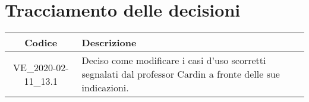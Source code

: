\section*{Tracciamento delle decisioni}

\begin{center}
	\begin{longtable}{|c|p{12.25cm}|}
	\hline
	\rowcolor{lighter-grayer}
	\textbf{Codice} & \textbf{Descrizione} \\
	\hline
	\endfirsthead
	
	\hline
	VE\_2020-02-11\_13.1 & Deciso come modificare i casi d'uso scorretti segnalati dal professor Cardin a fronte delle sue indicazioni. \\
	\hline

	\end{longtable}
\end{center}